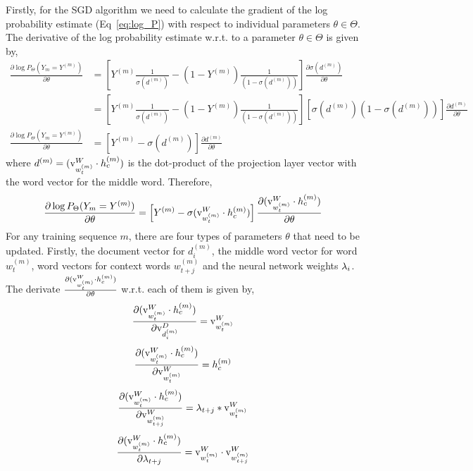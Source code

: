 Firstly, for the SGD algorithm we need to calculate the gradient of the log probability estimate (Eq~\ref{eq:log_P}) with respect to individual parameters $\theta \in \Theta$. The derivative of the log probability estimate w.r.t. to a parameter $\theta \in \Theta$ is given by,
\begin{align}
\frac{\partial \log P_{\Theta}(Y_{m}=Y^{(m)})} {\partial \theta} &= \left[ Y^{(m)}\frac{1}{\sigma(d^{(m)})} - (1-Y^{(m)})\frac{1}{(1 - \sigma(d^{(m)}))}\right] \frac{\partial \sigma(d^{(m)})}{\partial \theta} \\
&= \left[ Y^{(m)}\frac{1}{ \sigma(d^{(m)})} - (1 - Y^{(m)})\frac{1}{(1 - \sigma(d^{(m)}))}\right] \left[\sigma(d^{(m)})(1-\sigma(d^{(m)}))\right]\frac{\partial d^{(m)}}{\partial \theta} \\
\frac{\partial \log P_{\Theta}(Y_{m}=Y^{(m)})} {\partial \theta} &= \left[ Y^{(m)} - \sigma(d^{(m)})\right] \frac{\partial d^{(m)}}{\partial \theta}
\end{align}
where $d^{(m)} = (\mathrm{v}^{W}_{w^{(m)}_{t}} \cdot h^{(m)}_{c})$ is the dot-product of the projection layer vector with the word vector for the middle word. Therefore,
\begin{equation}
\label{eq:partial_theta}
\frac{\partial \log P_{\Theta}(Y_{m}=Y^{(m)})} {\partial \theta} = \left[ Y^{(m)} - \sigma(\mathrm{v}^{W}_{w^{(m)}_{t}} \cdot h^{(m)}_{c})\right] \frac{\partial (\mathrm{v}^{W}_{w^{(m)}_{t}} \cdot h^{(m)}_{c})}{\partial \theta}
\end{equation}
For any training sequence $m$, there are four types of parameters $\theta$ that need to be updated. Firstly, the document vector for $d^{(m)}_{i}$, the middle word vector for word $w^{(m)}_{t}$, word vectors for context words $w^{(m)}_{t+j}$ and the neural network weights $\lambda_{i}$. The derivate $\frac{\partial (\mathrm{v}^{W}_{w^{(m)}_{t}} \cdot h^{(m)}_{c})}{\partial \theta}$ w.r.t. each of them is given by,
\begin{equation}
\label{eq:partial_doc}
\frac{\partial (\mathrm{v}^{W}_{w^{(m)}_{t}} \cdot h^{(m)}_{c})}{\partial \mathrm{v}^{D}_{d^{(m)}_{i}}} = \mathrm{v}^{W}_{w^{(m)}_{t}}
\end{equation}
\begin{equation}
\label{eq:partial_w_t}
\frac{\partial (\mathrm{v}^{W}_{w^{(m)}_{t}} \cdot h^{(m)}_{c})}{\partial \mathrm{v}^{W}_{w^{(m)}_{t}}} = h^{(m)}_{c}
\end{equation}
\begin{equation}
\label{eq:partial_w_t-k}
\frac{\partial (\mathrm{v}^{W}_{w^{(m)}_{t}} \cdot h^{(m)}_{c})}{\partial \mathrm{v}^{W}_{w^{(m)}_{t+j}}} = \lambda_{t+j}* \mathrm{v}^{W}_{w^{(m)}_{t}}
\end{equation}
\begin{equation}
\label{eq:partial_wgt_t-k}
\frac{\partial (\mathrm{v}^{W}_{w^{(m)}_{t}} \cdot h^{(m)}_{c})}{\partial \lambda_{t+j}} = \mathrm{v}^{W}_{w^{(m)}_{t}} \cdot \mathrm{v}^{W}_{w^{(m)}_{t+j}}
\end{equation}

